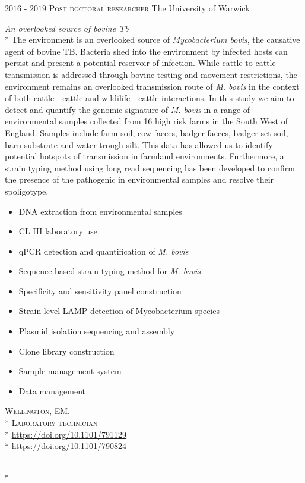 \documentclass[hidelinks]{james-cv} %
\begin{document}
\nopagebreak
\begin{entrylist}
\entry
{$2016$ - $2019$}
{\textsc{Post doctoral researcher}}
{The University of Warwick}
{\bodyfontsc\color{gray}{Myobacterium bovis and the farmland ecosystem: } \emph{An overlooked source of bovine Tb}\\*
\color{gray}\normalsize\thinfont The environment is an overlooked source of \textit{Mycobacterium bovis}, the causative agent of bovine TB. Bacteria shed into the environment by infected hosts can persist and present a potential reservoir of infection. While cattle to cattle transmission is addressed through bovine testing and movement restrictions, the environment remains an overlooked transmission route of \textit{M. bovis} in the context of both cattle - cattle and wildilife - cattle interactions. In this study we aim to detect and quantify the genomic signature of \textit{M. bovis} in a range of environmental samples collected from 16 high risk farms in the South West of England. Samples include farm soil, cow faeces, badger faeces, badger set soil, barn substrate and water trough silt. This data has allowed us to identify potential hotspots of transmission in farmland environments. Furthermore, a strain typing method using long read sequencing has been developed to confirm the presence of the pathogenic  in environmental samples and resolve their spoligotype.  
\color{gray}\normalsize\thinfont            
\begin{itemize}
\item DNA extraction from environmental samples
\item CL III laboratory use
\item qPCR detection and quantification of \textit{M. bovis}
\item Sequence based strain typing method for \textit{M. bovis} 
\item Specificity and sensitivity panel construction
\item Strain level LAMP detection of Mycobacterium species
\item Plasmid isolation sequencing and assembly
\item Clone library construction
\item Sample management system
\item Data management
\end{itemize}  
\bodyfontsc{}\textsc{Wellington, EM.}\\*
\bodyfontsc{}\textsc{Laboratory technician}\\*
\bodyfontsc{}\thinfont\color{blue}\href{https://www.biorxiv.org/content/10.1101/791129v2}{https://doi.org/10.1101/791129}\\*
\bodyfontsc\nolinebreak\color{gray}{DOI: }\thinfont\color{blue}\href{https://www.biorxiv.org/content/10.1101/790824v1}{https://doi.org/10.1101/790824}}\\*


\end{entrylist}
\end{document}
